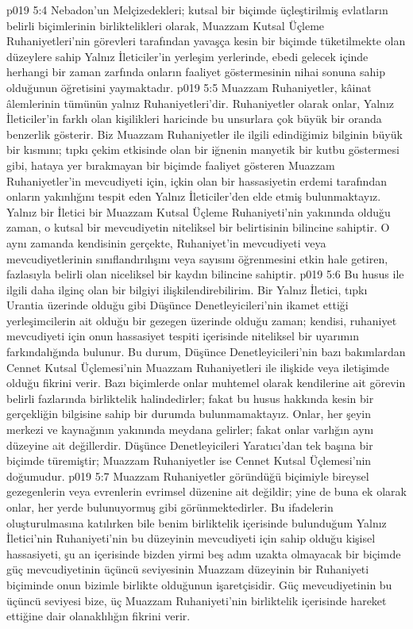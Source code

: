 \vs p019 5:4 Nebadon’un Melçizedekleri; kutsal bir biçimde üçleştirilmiş evlatların belirli biçimlerinin birliktelikleri olarak, Muazzam Kutsal Üçleme Ruhaniyetleri’nin görevleri tarafından yavaşça kesin bir biçimde tüketilmekte olan düzeylere sahip Yalnız İleticiler’in yerleşim yerlerinde, ebedi gelecek içinde herhangi bir zaman zarfında onların faaliyet göstermesinin nihai sonuna sahip olduğunun öğretisini yaymaktadır.
\vs p019 5:5 Muazzam Ruhaniyetler, kâinat âlemlerinin tümünün yalnız Ruhaniyetleri’dir. Ruhaniyetler olarak onlar, Yalnız İleticiler’in farklı olan kişilikleri haricinde bu unsurlara çok büyük bir oranda benzerlik gösterir. Biz Muazzam Ruhaniyetler ile ilgili edindiğimiz bilginin büyük bir kısmını; tıpkı çekim etkisinde olan bir iğnenin manyetik bir kutbu göstermesi gibi, hataya yer bırakmayan bir biçimde faaliyet gösteren Muazzam Ruhaniyetler’in mevcudiyeti için, içkin olan bir hassasiyetin erdemi tarafından onların yakınlığını tespit eden Yalnız İleticiler’den elde etmiş bulunmaktayız. Yalnız bir İletici bir Muazzam Kutsal Üçleme Ruhaniyeti’nin yakınında olduğu zaman, o kutsal bir mevcudiyetin niteliksel bir belirtisinin bilincine sahiptir. O aynı zamanda kendisinin gerçekte, Ruhaniyet’in mevcudiyeti veya mevcudiyetlerinin sınıflandırılışını veya sayısını öğrenmesini etkin hale getiren, fazlasıyla belirli olan niceliksel bir kaydın bilincine sahiptir.
\vs p019 5:6 Bu husus ile ilgili daha ilginç olan bir bilgiyi ilişkilendirebilirim. Bir Yalnız İletici, tıpkı Urantia üzerinde olduğu gibi Düşünce Denetleyicileri’nin ikamet ettiği yerleşimcilerin ait olduğu bir gezegen üzerinde olduğu zaman; kendisi, ruhaniyet mevcudiyeti için onun hassasiyet tespiti içerisinde niteliksel bir uyarımın farkındalığında bulunur. Bu durum, Düşünce Denetleyicileri’nin bazı bakımlardan Cennet Kutsal Üçlemesi’nin Muazzam Ruhaniyetleri ile ilişkide veya iletişimde olduğu fikrini verir. Bazı biçimlerde onlar muhtemel olarak kendilerine ait görevin belirli fazlarında birliktelik halindedirler; fakat bu husus hakkında kesin bir gerçekliğin bilgisine sahip bir durumda bulunmamaktayız. Onlar, her şeyin merkezi ve kaynağının yakınında meydana gelirler; fakat onlar varlığın aynı düzeyine ait değillerdir. Düşünce Denetleyicileri Yaratıcı’dan tek başına bir biçimde türemiştir; Muazzam Ruhaniyetler ise Cennet Kutsal Üçlemesi’nin doğumudur.
\vs p019 5:7 Muazzam Ruhaniyetler göründüğü biçimiyle bireysel gezegenlerin veya evrenlerin evrimsel düzenine ait değildir; yine de buna ek olarak onlar, her yerde bulunuyormuş gibi görünmektedirler. Bu ifadelerin oluşturulmasına katılırken bile benim birliktelik içerisinde bulunduğum Yalnız İletici’nin Ruhaniyeti’nin bu düzeyinin mevcudiyeti için sahip olduğu kişisel hassasiyeti, şu an içerisinde bizden yirmi beş adım uzakta olmayacak bir biçimde güç mevcudiyetinin üçüncü seviyesinin Muazzam düzeyinin bir Ruhaniyeti biçiminde onun bizimle birlikte olduğunun işaretçisidir. Güç mevcudiyetinin bu üçüncü seviyesi bize, üç Muazzam Ruhaniyeti’nin birliktelik içerisinde hareket ettiğine dair olanaklılığın fikrini verir.
